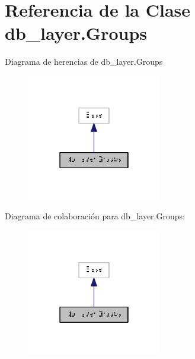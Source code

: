 \hypertarget{classdb__layer_1_1_groups}{\section{Referencia de la Clase db\-\_\-layer.\-Groups}
\label{classdb__layer_1_1_groups}
}


Diagrama de herencias de db\-\_\-layer.\-Groups\nopagebreak
\begin{figure}[H]
\begin{center}
\leavevmode
\includegraphics[width=166pt]{classdb__layer_1_1_groups__inherit__graph}
\end{center}
\end{figure}


Diagrama de colaboración para db\-\_\-layer.\-Groups\-:\nopagebreak
\begin{figure}[H]
\begin{center}
\leavevmode
\includegraphics[width=166pt]{classdb__layer_1_1_groups__coll__graph}
\end{center}
\end{figure}
